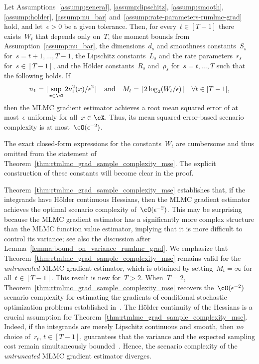 \documentclass[11pt]{article}
\begin{document}
\begin{theorem}\label{thm:rtmlmc_grad_sample_complexity_mse}
    Let Assumptions~\ref{assump:general}, \ref{assump:lipschitz}, \ref{assump:smooth}, \ref{assump:holder}, \ref{assump:nu_bar} and~\ref{assump:rate-parameters-rumlmc-grad} hold, and let~$\epsilon>0$ be a given tolerance. Then, for every~$t\in[T-1]$ there exists~$W_t$ that depends only on~$T$, the moment bounds from Assumption~\ref{assump:nu_bar}, the dimensions~$d_s$ and smoothness constants~$S_s$ for~$s = t+1,\ldots,T-1$, the Lipschitz constants~$L_s$ and the rate parameters~$r_s$ for~$s \in[T-1]$, and the Hölder constants~$R_s$ and~$\rho_s$ for~$s = t,\ldots,T$ such that the following holds. If
    \[
        n_1=\lceil \sup_{x\in\cX} 2\nu_1^2(x)/\epsilon^2\rceil\quad \text{and} \quad M_{t}  =\lceil 2\log_2(W_t /\epsilon)\rceil\quad \forall t\in[T-1],
    \]
    then the MLMC gradient estimator achieves a root mean squared error of at most~$\epsilon$ uniformly for all~$x\in\cX$. Thus, its mean squared error-based scenario complexity is at most~$\cO(\epsilon^{-2})$.
\end{theorem}

The exact closed-form expressions for the constants~$W_t$ are cumbersome and thus omitted from the statement of Theorem~\ref{thm:rtmlmc_grad_sample_complexity_mse}. The explicit construction of these constants will become clear in the proof.

Theorem~\ref{thm:rtmlmc_grad_sample_complexity_mse} establishes that, if the  integrands have Hölder continuous Hessians, then the MLMC gradient estimator achieves the optimal scenario complexity of~$\cO(\epsilon^{-2})$. This may be surprising because the MLMC gradient estimator has a significantly more complex structure than the MLMC function value estimator, implying that it is more difficult to control its variance; see also the discussion after Lemma~\ref{lemma:bound_on_variance_rumlmc_grad}. We emphasize that Theorem~\ref{thm:rtmlmc_grad_sample_complexity_mse} remains valid for the \emph{untruncated} MLMC gradient estimator, which is obtained by setting~$M_t = \infty$ for all~$t \in [T-1]$. This result is  new for~$T > 2$. When~$T = 2$, Theorem~\ref{thm:rtmlmc_grad_sample_complexity_mse} recovers the~$\cO(\epsilon^{-2})$ scenario complexity for estimating the gradients of conditional stochastic optimization problems established in~\cite[Theorem~2]{goda2023constructing}. The H\"older continuity of the Hessians is a crucial assumption for Theorem~\ref{thm:rtmlmc_grad_sample_complexity_mse}. 
Indeed, if the integrands are merely Lipschitz continuous and smooth, then \emph{no} choice of~$r_t$, $t \in [T-1]$, guarantees that the variance and the expected sampling cost remain simultaneously bounded~\citep{hu2021bias}. 
Hence, the scenario complexity of the \emph{untruncated} MLMC gradient estimator diverges.
\end{document}
